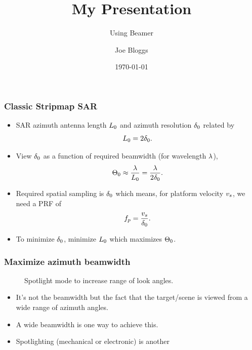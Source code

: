 \documentclass{beamer}
\title{My Presentation}
\subtitle{Using Beamer}
\author{Joe Bloggs}
\institute{University of ShareLaTeX}
\date{\today}
\begin{document}
\begin{frame}
\frametitle{Classic Stripmap SAR}
\begin{itemize}
\item SAR azimuth antenna length $L_0$ and azimuth resolution $\delta_0$ related by
\begin{equation}
 L_0 = 2\delta_0.
\end{equation}
\item View $\delta_0$ as a function of required beamwidth (for wavelength $\lambda$),
\begin{equation}
 \Theta_{0} \approx \frac{\lambda}{L_0} = \frac{\lambda}{2\delta_0}.
\end{equation}
\item Required spatial sampling is $\delta_0$ which means, for platform velocity $v_s$, we need a PRF of
\begin{equation}
 f_p = \frac{v_s}{\delta_0}.
\end{equation}
\item To minimize $\delta_0$, minimize $L_0$ which maximizes $\Theta_{0}$.
\end{itemize}
\end{frame}
%
\begin{frame}
\frametitle{Maximize azimuth beamwidth}
\begin{figure}[h!]
\begin{center}
 \resizebox{!}{0.4\textheight}{}
 \caption{Spotlight mode to increase range of look angles.}
 \label{fg:fivechan}
 \end{center}
\end{figure}
\begin{itemize}
\item It's not the beamwidth but the fact that the target/scene is viewed from a wide range of azimuth angles. 
\item A wide beamwidth is one way to achieve this.
\item Spotlighting (mechanical or electronic) is another 
\end{itemize}
\end{frame}
%
\end{document}
